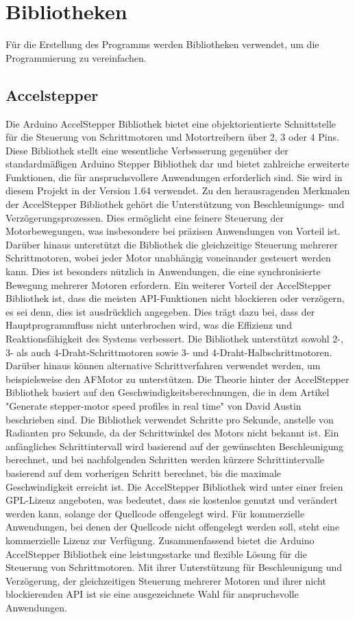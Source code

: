 \section{Bibliotheken}
Für die Erstellung des Programms werden Bibliotheken verwendet, um die Programmierung zu vereinfachen.

\subsection{Accelstepper}

Die Arduino AccelStepper Bibliothek bietet eine objektorientierte Schnittstelle für die Steuerung von Schrittmotoren und Motortreibern über 2, 3 oder 4 Pins. Diese Bibliothek stellt eine wesentliche Verbesserung gegenüber der standardmäßigen Arduino Stepper Bibliothek dar und bietet zahlreiche erweiterte Funktionen, die für anspruchsvollere Anwendungen erforderlich sind. Sie wird in diesem Projekt in der Version 1.64 verwendet.
Zu den herausragenden Merkmalen der AccelStepper Bibliothek gehört die Unterstützung von Beschleunigungs- und Verzögerungsprozessen. Dies ermöglicht eine feinere Steuerung der Motorbewegungen, was insbesondere bei präzisen Anwendungen von Vorteil ist. Darüber hinaus unterstützt die Bibliothek die gleichzeitige Steuerung mehrerer Schrittmotoren, wobei jeder Motor unabhängig voneinander gesteuert werden kann. Dies ist besonders nützlich in Anwendungen, die eine synchronisierte Bewegung mehrerer Motoren erfordern.
Ein weiterer Vorteil der AccelStepper Bibliothek ist, dass die meisten API-Funktionen nicht blockieren oder verzögern, es sei denn, dies ist ausdrücklich angegeben. Dies trägt dazu bei, dass der Hauptprogrammfluss nicht unterbrochen wird, was die Effizienz und Reaktionsfähigkeit des Systems verbessert. Die Bibliothek unterstützt sowohl 2-, 3- als auch 4-Draht-Schrittmotoren sowie 3- und 4-Draht-Halbschrittmotoren. Darüber hinaus können alternative Schrittverfahren verwendet werden, um beispielsweise den AFMotor zu unterstützen.
Die Theorie hinter der AccelStepper Bibliothek basiert auf den Geschwindigkeitsberechnungen, die in dem Artikel "Generate stepper-motor speed profiles in real time" von David Austin beschrieben sind. Die Bibliothek verwendet Schritte pro Sekunde, anstelle von Radianten pro Sekunde, da der Schrittwinkel des Motors nicht bekannt ist. Ein anfängliches Schrittintervall wird basierend auf der gewünschten Beschleunigung berechnet, und bei nachfolgenden Schritten werden kürzere Schrittintervalle basierend auf dem vorherigen Schritt berechnet, bis die maximale Geschwindigkeit erreicht ist.
Die AccelStepper Bibliothek wird unter einer freien GPL-Lizenz angeboten, was bedeutet, dass sie kostenlos genutzt und verändert werden kann, solange der Quellcode offengelegt wird. Für kommerzielle Anwendungen, bei denen der Quellcode nicht offengelegt werden soll, steht eine kommerzielle Lizenz zur Verfügung.
Zusammenfassend bietet die Arduino AccelStepper Bibliothek eine leistungsstarke und flexible Lösung für die Steuerung von Schrittmotoren. Mit ihrer Unterstützung für Beschleunigung und Verzögerung, der gleichzeitigen Steuerung mehrerer Motoren und ihrer nicht blockierenden API ist sie eine ausgezeichnete Wahl für anspruchsvolle Anwendungen.\cite{MikeMcCauley.2024}

